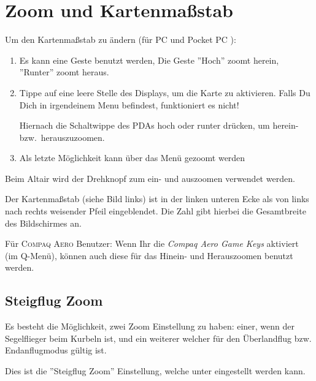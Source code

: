 \section{Zoom und Kartenmaßstab}\label{zoom}\label{kartenmasstab}
Um den Kartenmaßstab zu ändern  (für \textsf{PC}  und  \textsf{Pocket PC} ):
\begin{enumerate}
\item Es kann eine Geste benutzt werden, Die Geste 
     ''Hoch'' zoomt herein,  ''Runter'' zoomt heraus.
  \item Tippe auf eine leere Stelle des Displays, um die Karte zu aktivieren. Falls Du Dich in irgendeinem Menu befindest, funktioniert es nicht! 

  Hiernach die Schaltwippe des \textsf{PDA}s hoch oder runter drücken, um herein- bzw.\ herauszuzoomen.
  
     \item Als letzte Möglichkeit kann über das Menü gezoomt werden
\end{enumerate}

Beim Altair wird der Drehknopf zum ein- und auszoomen verwendet werden.

Der Kartenmaßstab (siehe Bild links)  ist in der linken unteren Ecke als von links nach rechts weisender Pfeil eingeblendet.    Die Zahl gibt hierbei die Gesamtbreite des Bildschirmes an.

Für \textsc{Compaq Aero} Benutzer: Wenn Ihr die \textsl{Compaq Aero Game Keys} aktiviert (im Q-Menü), können auch diese für das Hinein- und Herauszoomen benutzt werden.

\subsection*{Steigflug Zoom}
Es besteht die Möglichkeit, zwei Zoom Einstellung zu haben: einer, wenn der Segelflieger beim Kurbeln ist, und ein weiterer welcher für den Überlandflug bzw. Endanflugmodus gültig ist.

Dies ist die ''Steigflug Zoom'' Einstellung, welche unter  eingestellt werden kann.

